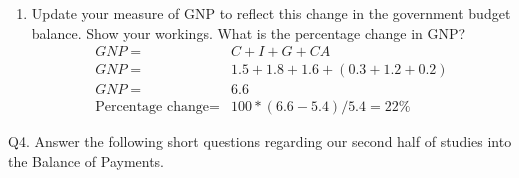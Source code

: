 \documentclass[12pt]{article}
\begin{document}
\begin{enumerate}[1)]
	\item Update your measure of GNP to reflect this change in the government budget balance. Show your workings. What is the percentage change in GNP?
	\begin{align*}
	GNP=& C+I+G+CA\\
	GNP=& 1.5+1.8+1.6+(0.3+1.2+0.2)\\
	GNP=& 6.6\\
	\text{Percentage change} =&  100*(6.6-5.4)/5.4 =22\%
	\end{align*}

	\vspace{0.2in}
	
\end{enumerate}

\noindent Q4. Answer the following short questions regarding our second half of studies into the Balance of Payments.
\end{document}
